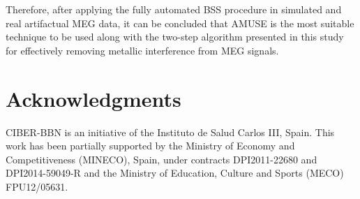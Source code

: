 Therefore, after applying the fully automated BSS procedure in simulated and real artifactual MEG data, it can be concluded that AMUSE is the most suitable technique to be used along with the two-step algorithm presented in this study for effectively removing metallic interference from MEG signals.

\section{Acknowledgments}

CIBER-BBN is an initiative of the Instituto de Salud Carlos III, Spain. This work has been partially supported by the Ministry of Economy and Competitiveness (MINECO), Spain, under contracts DPI2011-22680 and DPI2014-59049-R and the Ministry of Education, Culture and Sports (MECO) FPU12/05631.